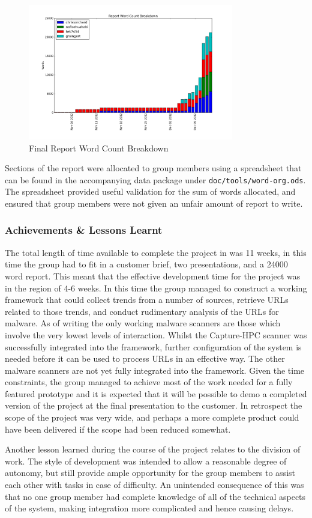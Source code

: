 \begin{figure}[htb]
\centering
\includegraphics[width=0.8\textwidth]{img/reportificate.png}
\caption{Final Report Word Count Breakdown}
\label{fig:rep-1}
\end{figure}

Sections of the report were allocated to group members using a spreadsheet that
can be found in the accompanying data package under
\verb`doc/tools/word-org.ods`. The spreadsheet provided useful validation for
the sum of words allocated, and ensured that group members were not given an
unfair amount of report to write.

\subsubsection{Achievements \& Lessons Learnt}

The total length of time available to complete the project in was 11 weeks, in
this time the group had to fit in a customer brief, two presentations, and a
24000 word report. This meant that the effective development time for the
project was in the region of 4-6 weeks. In this time the group managed to
construct a working framework that could collect trends from a number of
sources, retrieve URLs related to those trends, and conduct rudimentary analysis
of the URLs for malware. As of writing the only working malware scanners are
those which involve the very lowest levels of interaction. Whilst the
Capture-HPC scanner was successfully integrated into the framework, further
configuration of the system is needed before it can be used to process URLs in
an effective way. The other malware scanners are not yet fully integrated into
the framework. Given the time constraints, the group managed to achieve most of
the work needed for a fully featured prototype and it is expected that it will be
possible to demo a completed version of the project at the final presentation to
the customer. In retrospect the scope of the project was very wide, and perhaps
a more complete product could have been delivered if the scope had been reduced
somewhat.

Another lesson learned during the course of the project relates to the division
of work. The style of development was intended to allow a reasonable degree of
autonomy, but still provide ample opportunity for the group members to assist
each other with tasks in case of difficulty. An unintended consequence of this
was that no one group member had complete knowledge of all of the technical
aspects of the system, making integration more complicated and hence causing
delays.

